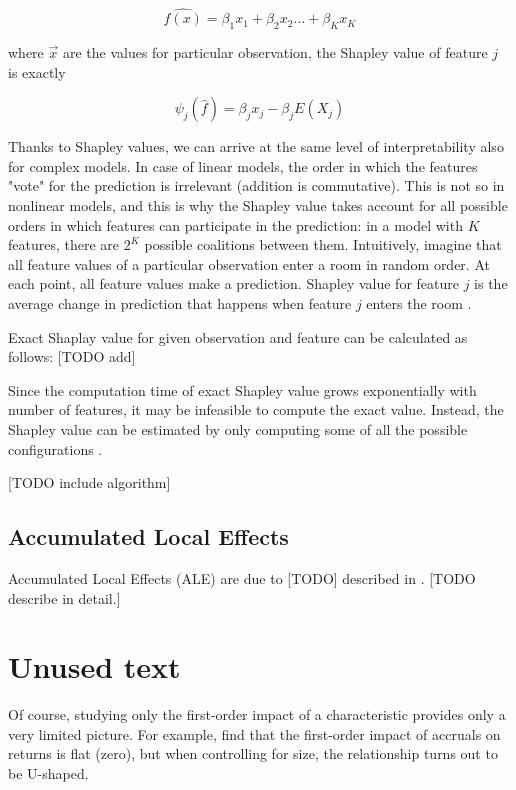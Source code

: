 		\begin{equation}
		\hat{f(x)} = \beta_1x_1 + \beta_2x_2 \ldots + \beta_K x_K
		\end{equation}
		
		where $\vec{x}$ are the values for particular observation, the Shapley value of feature $j$ is exactly
		
		\begin{equation}
		\psi_j(\hat{f}) = \beta_jx_j - \beta_jE(X_j)
		\end{equation}
		
		Thanks to Shapley values, we can arrive at the same level of interpretability also for complex models. In case of linear models, the order in which the features "vote" for the prediction is irrelevant (addition is commutative). This is not so in nonlinear models, and this is why the Shapley value takes account for all possible orders in which features can participate in the prediction: in a model with $K$ features, there are $2^K$ possible coalitions between them. Intuitively, imagine that all feature values of a particular observation enter a room in random order. At each point, all feature values make a prediction. Shapley value for feature $j$ is the average change in prediction that happens when feature $j$ enters the room \citep{molnar2020interpretable}. 
		
		Exact Shaplay value for given observation and feature can be calculated as follows: [TODO add]
		
		Since the computation time of exact Shapley value grows exponentially with number of features, it may be infeasible to compute the exact value. Instead, the Shapley value can be estimated by only computing some of all the possible configurations \citep{vstrumbelj2014explaining}.  
		
		[TODO include algorithm]
		 
				
		\subsection{Accumulated Local Effects} 
			Accumulated Local Effects (ALE) are due to [TODO] described in \cite{molnar2020interpretable}. [TODO describe in detail.]


	\section{Unused text}
		
	   		Of course, studying only the first-order impact of a characteristic provides only a very limited picture. For example, \cite{bryzgalova2019forest} find that the first-order impact of accruals on returns is flat (zero), but when controlling for size, the relationship turns out to be U-shaped. 
	



